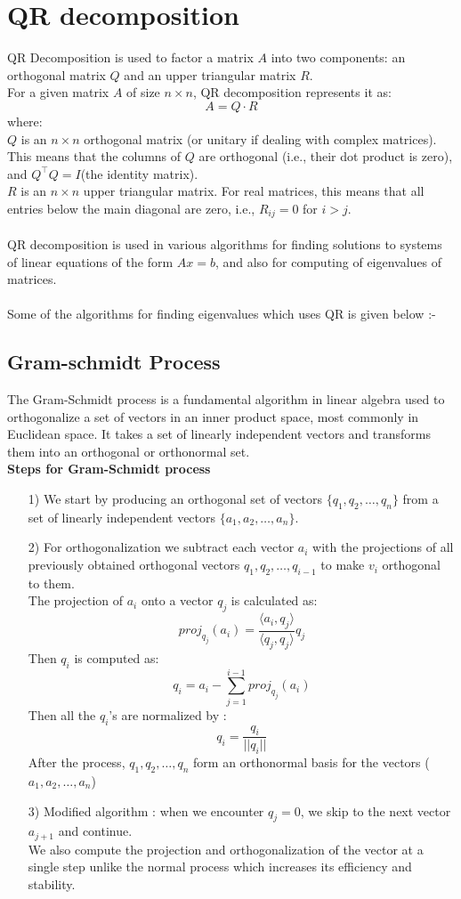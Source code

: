 \documentclass[12pt]{article}
\begin{document}
\section{QR decomposition}
QR Decomposition is used to factor a matrix $A$ into two components: an orthogonal matrix $Q$ and an upper triangular matrix $R$.\\
For a given matrix $A$ of size $n\times n$, QR decomposition represents it as:
$$A=Q\cdot R $$
where:\\
    $Q$ is an $n\times n$ orthogonal matrix (or unitary if dealing with complex matrices). This means that the columns of $Q$ are orthogonal (i.e., their dot product is zero), and $Q^\top Q=I$(the identity matrix).\\
    $R$ is an $n\times n$ upper triangular matrix. For real matrices, this means that all entries below the main diagonal are zero, i.e., $R_{ij}=0$ for $i>j$.\\ \\
    QR decomposition is used in various algorithms for finding solutions to systems of linear equations of the form $Ax=b$, and also for computing of eigenvalues of matrices.\\ \\
    Some of the algorithms for finding eigenvalues which uses QR is given below :-

\subsection{Gram-schmidt Process}
The Gram-Schmidt process is a fundamental algorithm in linear algebra used to orthogonalize a set of vectors in an inner product space, most commonly in Euclidean space. It takes a set of linearly independent vectors and transforms them into an orthogonal or orthonormal set.\\
\textbf{Steps for Gram-Schmidt process} 
\begin{enumerate}
    \item[1)] We start by producing an orthogonal set of vectors \( \{ q_1, q_2, \dots, q_n \} \) from a set of linearly independent vectors \( \{ a_1, a_2, \dots, a_n \} \).
    \item[2)] For orthogonalization we subtract each vector $a_i$ with the projections of all previously obtained orthogonal vectors $q_1,q_2,…,q_{i-1}$ to make $v_i$ orthogonal to them. \\
    The projection of $a_i$ onto a vector $q_j$ is calculated as:
    $$proj_{q_j}(a_i)= \frac{\langle a_i,q_j\rangle}{\langle q_j,q_j\rangle}q_j$$
    Then $q_i$ is computed as:
    $$q_i = a_i- \sum_{j=1}^{i-1}proj_{q_j}(a_i)$$
    Then all the $q_i$'s are normalized by :
    $$q_i = \frac{q_i}{||q_i||}$$
    After the process, $q_1,q_2,\dots,q_n$ form an orthonormal basis for the vectors ($a_1,a_2,\dots,a_n$)
    \item[3)] Modified algorithm : when we encounter $q_j=0$, we skip to the next vector $a_{j+1}$ and continue.\\
    We also compute the projection and orthogonalization of the vector at a single step unlike the normal process which increases its efficiency and stability.
\end{enumerate}
\end{document}
